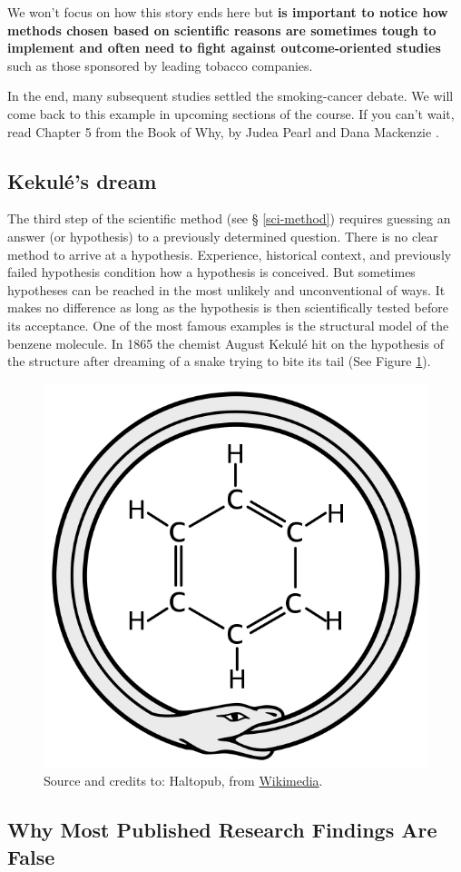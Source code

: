 \documentclass[
]{book}
\begin{document}
We won't focus on how this story ends here but \textbf{is important to notice how methods chosen based on scientific reasons are sometimes tough to implement and often need to fight against outcome-oriented studies} such as those sponsored by leading tobacco companies.

In the end, many subsequent studies settled the smoking-cancer debate. We will come back to this example in upcoming sections of the course. If you can't wait, read Chapter 5 from the Book of Why, by Judea Pearl and Dana Mackenzie \citep{book-of-why}.

\hypertarget{kekuluxe9s-dream}{%
\subsection{Kekulé's dream}\label{kekuluxe9s-dream}}

The third step of the scientific method (see § \ref{sci-method}) requires guessing an answer (or hypothesis) to a previously determined question. There is no clear method to arrive at a hypothesis. Experience, historical context, and previously failed hypothesis condition how a hypothesis is conceived. But sometimes hypotheses can be reached in the most unlikely and unconventional of ways. It makes no difference as long as the hypothesis is then scientifically tested before its acceptance. One of the most famous examples is the structural model of the benzene molecule. In 1865 the chemist August Kekulé hit on the hypothesis of the structure after dreaming of a snake trying to bite its tail (See Figure \ref{fig:ouroboros}).



\begin{figure}

{\centering \includegraphics[width=0.25\linewidth]{Figures/Ouroboros-benzene} 

}

\caption{Source and credits to: Haltopub, from \href{https://en.wikipedia.org/wiki/File:Ouroboros-benzene.svg}{Wikimedia}.}\label{fig:ouroboros}
\end{figure}

\hypertarget{why-most-published-research-findings-are-false}{%
\subsection{Why Most Published Research Findings Are False}\label{why-most-published-research-findings-are-false}}
\end{document}
